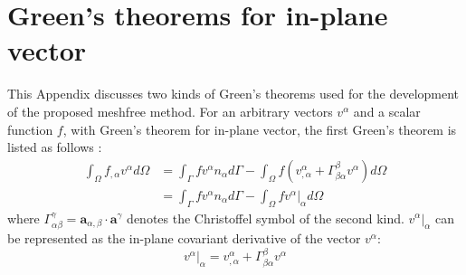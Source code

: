 \section{Green's theorems for in-plane vector}\label{derivative}
This Appendix discusses two kinds of Green’s theorems used for the development of the proposed meshfree method. For an arbitrary vectors $v^\alpha$ and a scalar function $f$, with Green’s theorem for in-plane vector, the first Green’s theorem is listed as follows \cite{benzaken2021}:
\begin{equation}
\begin{split}
\int_\Omega f_{,\alpha} v^\alpha d\Omega &= \int_\Gamma f v^\alpha n_\alpha d\Gamma - \int_\Omega f (v_{,\alpha}^\alpha + \Gamma^\beta_{\beta\alpha}v^\alpha) d\Omega \\
&= \int_\Gamma f v^\alpha n_\alpha d\Gamma - \int_\Omega f v^\alpha\vert_\alpha d\Omega
\end{split}
\end{equation}
where $\Gamma^\gamma_{\alpha\beta} = \boldsymbol a_{\alpha,\beta}\cdot \boldsymbol a^\gamma$ denotes the Christoffel symbol of the second kind. $v^\alpha\vert_\alpha$ can be represented as the in-plane covariant derivative of the vector $v^\alpha$:
\begin{equation}
v^\alpha\vert_\alpha= v^\alpha_{,\alpha} + \Gamma^\beta_{\beta\alpha} v^\alpha
\end{equation}


